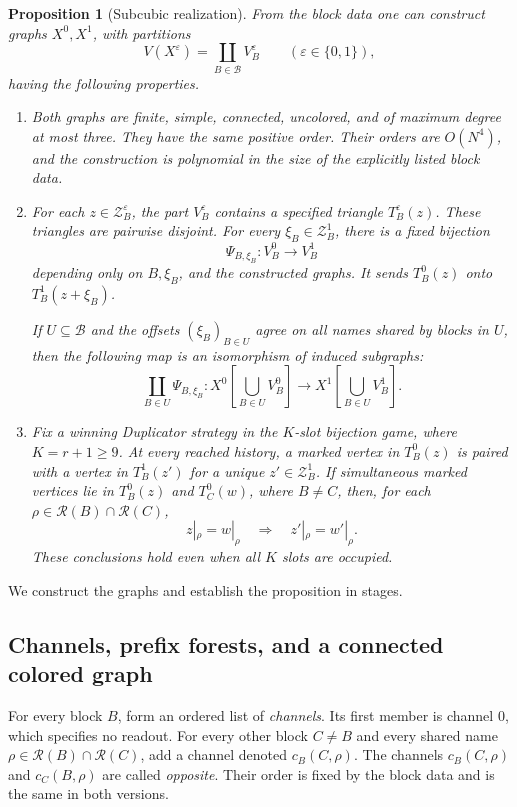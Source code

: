 \documentclass[11pt]{article}
\newtheorem{proposition}[theorem]{Proposition}
\theoremstyle{definition}
\newcommand{\cB}{\mathcal B}
\newcommand{\cR}{\mathcal R}
\newcommand{\cZ}{\mathcal Z}
\newcommand{\eps}{\varepsilon}
\begin{document}
\begin{proposition}[Subcubic realization]
\label{prop:subcubic-realization}
From the block data one can construct graphs \(X^0,X^1\), with
partitions
\[
  V(X^\eps)=\coprod_{B\in\cB}V_B^\eps
  \qquad(\eps\in\{0,1\}),
\]
having the following properties.
\begin{enumerate}
\item
Both graphs are finite, simple, connected, uncolored, and of maximum
degree at most three.  They have the same positive order.
Their orders are \(O(N^4)\), and the construction is polynomial in the
size of the explicitly listed block data.
\item
For each \(z\in\cZ_B^\eps\), the part \(V_B^\eps\) contains a specified
triangle \(T_B^\eps(z)\).  These triangles are pairwise disjoint.
For every \(\xi_B\in\cZ_B^1\), there is a fixed bijection
\[
  \Psi_{B,\xi_B}:V_B^0\longrightarrow V_B^1
\]
depending only on \(B,\xi_B\), and the constructed graphs.  It sends
\(T_B^0(z)\) onto \(T_B^1(z+\xi_B)\).
\par{}
If \(U\subseteq\cB\) and the offsets
\((\xi_B)_{B\in U}\) agree on all names shared by blocks in \(U\), then
the following map is an isomorphism of induced subgraphs:
\[
 \coprod_{B\in U}\Psi_{B,\xi_B}:
 X^0\left[\bigcup_{B\in U}V_B^0\right]
 \longrightarrow
 X^1\left[\bigcup_{B\in U}V_B^1\right].
\]
\item
Fix a winning Duplicator strategy in the \(K\)-slot bijection game,
where \(K=r+1\ge9\).
At every reached history, a marked vertex in \(T_B^0(z)\) is paired
with a vertex in \(T_B^1(z')\) for a unique \(z'\in\cZ_B^1\).
If simultaneous marked vertices lie in \(T_B^0(z)\) and \(T_C^0(w)\),
where \(B\ne C\), then, for each
\(\rho\in\cR(B)\cap\cR(C)\),
\[
     z|_\rho=w|_\rho
     \quad\Longrightarrow\quad
     z'|_\rho=w'|_\rho .
\]
These conclusions hold even when all \(K\) slots are occupied.
\end{enumerate}
\end{proposition}

We construct the graphs and establish the proposition in stages.

\subsection{Channels, prefix forests, and a connected colored graph}

For every block \(B\), form an ordered list of \emph{channels}.
Its first member is channel \(0\), which specifies no readout.
For every other block \(C\ne B\) and every shared name
\(\rho\in\cR(B)\cap\cR(C)\), add a channel denoted
\(c_B(C,\rho)\).
The channels \(c_B(C,\rho)\) and \(c_C(B,\rho)\) are called
\emph{opposite}.  Their order is fixed by the block data and is the
same in both versions.
\end{document}
